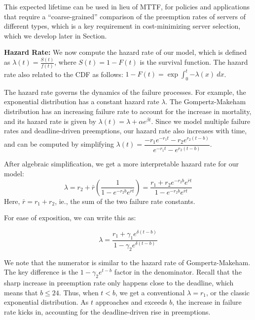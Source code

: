 This expected lifetime can be used in lieu of MTTF, for policies and applications that require a ``coarse-grained'' comparison of the preemption rates of servers of different types, which is a key requirement in cost-minimizing server selection, which we develop later in Section. 


\noindent \textbf{Hazard Rate:}
We now compute the hazard rate of our model, which is defined as  $\lambda(t) = \frac{S(t)}{f(t)}$, where $S(t) = 1 - F(t)$ is the survival function.
The hazard rate also related to the CDF as follows: $1-F(t) = \exp{\int_0^t{-\lambda(x) ~dx}}$. 

The hazard rate governs the dynamics of the failure processes.
For example, the exponential distribution has a constant hazard rate $\lambda$.
The Gompertz-Makeham distribution has an increasing failure rate to account for the increase in mortality, and its hazard rate is given by $\lambda(t) = \lambda + \alpha e^{\beta t}$.
Since we model multiple failure rates and deadline-driven preemptions, our hazard rate also increases with time, and can be computed by simplifying $\lambda(t) = \dfrac{- r_1 e^{- r_1 t} - r_2 e^{r_2 (t -
    b)}}{e^{- r_1 t} - e^{r_2 (t - b)}}$. 

\noindent After algebraic simplification, we get a more interpretable hazard rate for our model:
\begin{equation}
  \label{eq:hmodel}
  \lambda = r_2 + \bar{r} \left( \dfrac{1}{1 - e^{- r_2 b} e^{\bar{r} t}}\right)
  = \dfrac{r_1 + r_2 e^{- r_2 b} e^{\bar{r} t}}{1 - e^{- r_2 b} e^{\bar{r} t}}  
\end{equation}
Here, $\bar{r} = r_1 + r_2$, ie., the sum of the two failure rate constants.

For ease of exposition, we can write this as:

\begin{equation}
  \label{eq:hmodelsimple}
\lambda =  \dfrac{r_1 + \gamma_1 e^{\delta (t-b)}}{1 - \gamma_2 e^{\delta (t-b)}}
\end{equation}

We note that the numerator is  similar to the hazard rate of Gompertz-Makeham.
The key difference is the $1-\gamma_2 e^{t-b}$ factor in the denominator. 
Recall that the sharp increase in preemption rate only happens close to the deadline, which means that $b \leq 24$. Thus, when $t < b$, we get a conventional $\lambda = r_1$, or the classic exponential distribution.
As $t$ approaches and exceeds $b$, the increase in failure rate kicks in, accounting for the deadline-driven rise in preemptions. 



